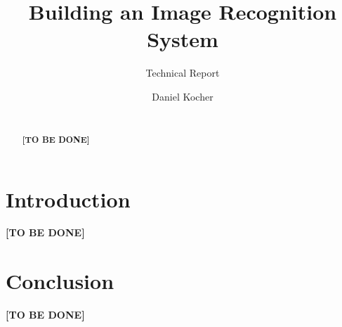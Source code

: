 \documentclass{vldb}
\newcommand{\tbd}{\textbf{[TO BE DONE]}}
\begin{document}
\title{Building an Image Recognition System}
\subtitle{Technical Report}


\author{
\alignauthor
	Daniel Kocher\\
  \\
}

\maketitle

\begin{abstract}
\tbd
\end{abstract}

\section{Introduction}
\label{sec:introduction}

\tbd

\section{Conclusion}
\label{sec:conclusion}

\tbd


%
%

\end{document}
